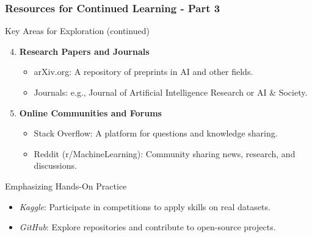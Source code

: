 \documentclass[aspectratio=169]{beamer}
\begin{document}
\begin{frame}[fragile]
    \frametitle{Resources for Continued Learning - Part 3}
    \begin{block}{Key Areas for Exploration (continued)}
        \begin{enumerate}
            \setcounter{enumi}{3} %
            \item \textbf{Research Papers and Journals}
                \begin{itemize}
                    \item arXiv.org: A repository of preprints in AI and other fields.
                    \item Journals: e.g., Journal of Artificial Intelligence Research or AI \& Society.
                \end{itemize}
            \item \textbf{Online Communities and Forums}
                \begin{itemize}
                    \item Stack Overflow: A platform for questions and knowledge sharing.
                    \item Reddit (r/MachineLearning): Community sharing news, research, and discussions.
                \end{itemize}
        \end{enumerate}
    \end{block}
    
    \begin{block}{Emphasizing Hands-On Practice}
        \begin{itemize}
            \item \textit{Kaggle}: Participate in competitions to apply skills on real datasets.
            \item \textit{GitHub}: Explore repositories and contribute to open-source projects.
        \end{itemize}
    \end{block}
\end{frame}
\end{document}
